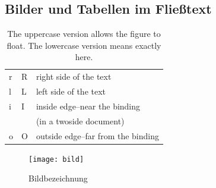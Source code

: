\subsection{Bilder und Tabellen im Fließtext}

\begin{table}
	\begin{center}
		\begin{tabular}{|l|l|l|}
			\hline
			r & R & right side of the text\\
			l & L & left side of the text\\
			i & I & inside edge–near the binding\\
			& &  (in a twoside document)\\
			o & O & outside edge–far from the binding\\
			\hline
		\end{tabular}
	\end{center}
	\caption{The uppercase version allows the figure to float. The lowercase version means exactly here.}%
\end{table}

\blindtext[2]

\begin{figure}
	\texttt{[image: bild]}
	\caption{Bildbezeichnung}
	\label{fig:bild}
\end{figure}

\blindtext[2]